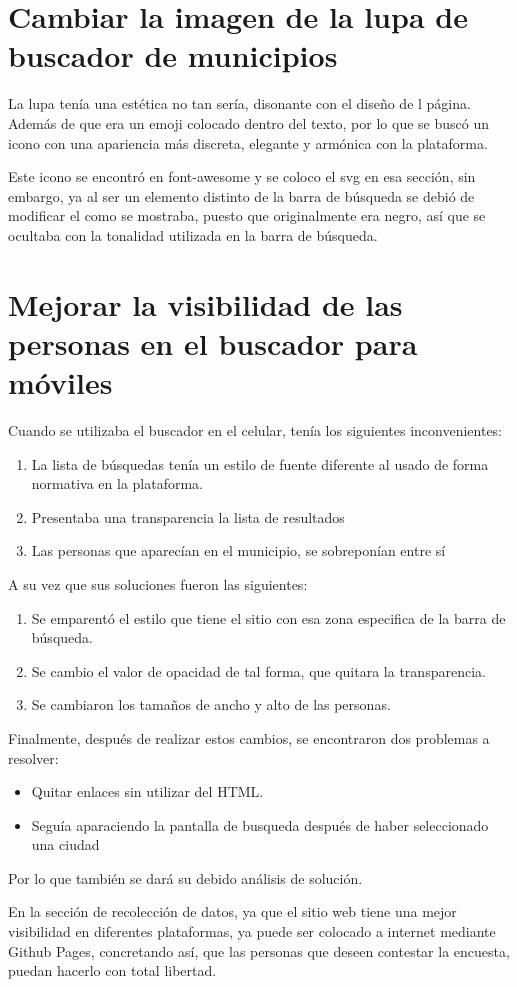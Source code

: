 \documentclass[11pt,DIV=9, letterpaper, oneside, openright]{scrartcl}
\begin{document}
\section{Cambiar la imagen de la lupa de buscador de municipios}

La lupa tenía una estética no tan sería, disonante con el diseño de l página. Además de que era un emoji colocado dentro del texto, por lo que se buscó un icono con una apariencia más discreta, elegante y armónica con la plataforma. 

Este icono se encontró en font-awesome\cite{Font-Awesome} y se coloco el svg en esa sección, sin embargo, ya al ser un elemento distinto de la barra de búsqueda se debió de modificar el como se mostraba, puesto que originalmente era negro, así que se ocultaba con la tonalidad utilizada en la barra de búsqueda.

\section{Mejorar la visibilidad de las personas en el buscador para móviles}

Cuando se utilizaba el buscador en el celular, tenía los siguientes inconvenientes:

\begin{enumerate}
    \item La lista de búsquedas tenía un estilo de fuente diferente al usado de forma normativa en la plataforma.
    \item Presentaba una transparencia la lista de resultados
    \item Las personas que aparecían en el municipio, se sobreponían entre sí
\end{enumerate}

A su vez que sus soluciones fueron las siguientes:
\begin{enumerate}
    \item Se emparentó el estilo que tiene el sitio con esa zona especifica de la barra de búsqueda.
    \item Se cambio el valor de opacidad de tal forma, que quitara la transparencia.
    \item Se cambiaron los tamaños de ancho y alto de las personas.
\end{enumerate}  

Finalmente, después de realizar estos cambios, se encontraron dos problemas a resolver:
\begin{itemize}
    \item Quitar enlaces sin utilizar del HTML.
    \item Seguía aparaciendo la pantalla de busqueda después de haber seleccionado una ciudad
\end{itemize}
 Por lo que también se dará su debido análisis de solución.

En la sección de recolección de datos, ya que el sitio web tiene una mejor visibilidad en diferentes plataformas, ya puede ser colocado a internet mediante Github Pages, concretando así, que las personas que deseen contestar la encuesta, puedan hacerlo con total libertad. 

 

\end{document}
